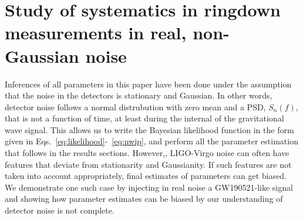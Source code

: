 \section{Study of systematics in ringdown measurements in real, non-Gaussian noise}\label{sec:noise_systematics}


Inferences of all parameters in this paper have been done under the assumption that the noise in the detectors is stationary and Gaussian. In other words, detector noise follows a normal distrubution with zero mean and a PSD, $S_n(f)$, that is not a function of time, at least during the internal of the gravitational wave signal. This allows us to write the Bayesian likelihood function in the form given in Eqs.~\ref{eq:likelihood}-~\ref{eq:nwip}, and perform all the parameter estimation that follows in the results sections. However,, LIGO-Virgo noise can often have features that deviate from stationarity and Gaussianity. If such features are not taken into account appropriately, final estimates of parameters can get biased. We demonstrate one such case by injecting in real noise a GW190521-like signal and showing how parameter estimates can be biased by our understanding of detector noise is not complete.

